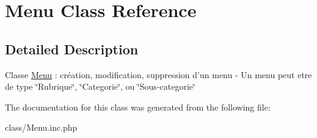 \hypertarget{class_menu}{
\section{Menu Class Reference}
\label{class_menu}
}


\subsection{Detailed Description}
Classe \hyperlink{class_menu}{Menu} : création, modification, suppression d'un menu -\/ Un menu peut etre de type \char`\"{}Rubrique\char`\"{}, \char`\"{}Categorie\char`\"{}, ou \char`\"{}Sous-\/categorie\char`\"{} 

The documentation for this class was generated from the following file:\begin{DoxyCompactItemize}
\item 
class/Menu.inc.php\end{DoxyCompactItemize}
